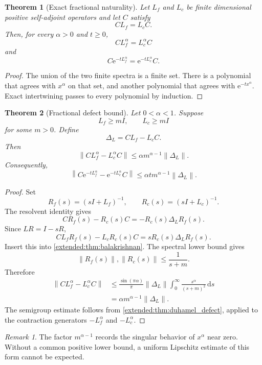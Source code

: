 \documentclass[11pt,letterpaper]{article}
\newtheorem{theorem}{Theorem}[section]
\theoremstyle{plain}
\theoremstyle{plain}
\theoremstyle{plain}
\theoremstyle{definition}
\theoremstyle{definition}
\theoremstyle{definition}
\theoremstyle{definition}
\theoremstyle{definition}
\theoremstyle{remark}
\theoremstyle{remark}
\newtheorem{remark}[remark]{Remark}
\theoremstyle{remark}
\theoremstyle{remark}
\theoremstyle{remark}
\newcommand{\norm}[1]{\left\lVert#1\right\rVert}
\theoremstyle{remark}
\newcommand{\e}{\mathrm e}
\newcommand{\dd}{\,\mathrm d}
\let\KomorebiPrimitivemathrm\mathrm
\renewcommand{\mathrm}[1]{{\KomorebiPrimitivemathrm{#1}}}
\begin{document}
\begin{theorem}[Exact fractional naturality]\label{extended:record:069}\label{extended:thm:exact_fractional_naturality}
Let \(L_f\) and \(L_c\) be finite dimensional positive self-adjoint operators and let \(C\) satisfy
\[
CL_f=L_cC.
\]
Then, for every \(\alpha>0\) and \(t\geq0\),
\[
CL_f^\alpha=L_c^\alpha C
\]
and
\[
C\e^{-tL_f^\alpha}
=
\e^{-tL_c^\alpha}C.
\]
\end{theorem}

\begin{proof}
The union of the two finite spectra is a finite set. There is a polynomial that agrees with \(x^\alpha\) on that set, and another polynomial that agrees with \(\e^{-tx^\alpha}\). Exact intertwining passes to every polynomial by induction.
\end{proof}

\begin{theorem}[Fractional defect bound]\label{extended:record:070}\label{extended:thm:fractional_defect}
Let \(0<\alpha<1\). Suppose
\[
L_f\geq mI,
\qquad
L_c\geq mI
\]
for some \(m>0\). Define
\[
\Delta_L=CL_f-L_cC.
\]
Then
\[
\norm{CL_f^\alpha-L_c^\alpha C}
\leq
\alpha m^{\alpha-1}\norm{\Delta_L}.
\]
Consequently,
\[
\norm{
C\e^{-tL_f^\alpha}
-
\e^{-tL_c^\alpha}C
}
\leq
\alpha t m^{\alpha-1}\norm{\Delta_L}.
\]
\end{theorem}

\begin{proof}
Set
\[
R_f(s)=(sI+L_f)^{-1},
\qquad
R_c(s)=(sI+L_c)^{-1}.
\]
The resolvent identity gives
\[
CR_f(s)-R_c(s)C
=
-R_c(s)\Delta_LR_f(s).
\]
Since \(LR=I-sR\),
\[
CL_fR_f(s)-L_cR_c(s)C
=
sR_c(s)\Delta_LR_f(s).
\]
Insert this into \cref{extended:thm:balakrishnan}. The spectral lower bound gives
\[
\norm{R_f(s)},\norm{R_c(s)}
\leq
\frac{1}{s+m}.
\]
Therefore
\[
\begin{aligned}
\norm{CL_f^\alpha-L_c^\alpha C}
&\leq
\frac{\sin(\pi\alpha)}{\pi}
\norm{\Delta_L}
\int_0^\infty
\frac{s^\alpha}{(s+m)^2}\dd s\\
&=
\alpha m^{\alpha-1}\norm{\Delta_L}.
\end{aligned}
\]
The semigroup estimate follows from \cref{extended:thm:duhamel_defect}, applied to the contraction generators \(-L_f^\alpha\) and \(-L_c^\alpha\).
\end{proof}

\begin{remark}\label{extended:record:071}
The factor \(m^{\alpha-1}\) records the singular behavior of \(x^\alpha\) near zero. Without a common positive lower bound, a uniform Lipschitz estimate of this form cannot be expected.
\end{remark}
\end{document}
